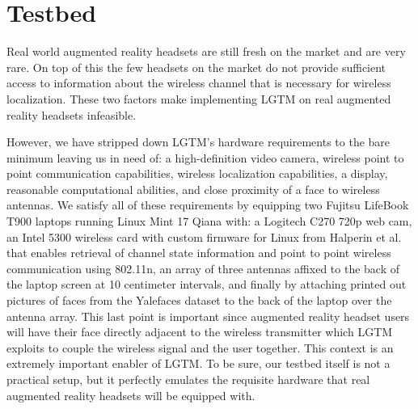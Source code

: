 \documentclass[12pt]{report}
\begin{document}
\section{Testbed}
Real world augmented reality headsets are still fresh on the market and are very rare. On top of this the few headsets on the market do not provide sufficient access to information about the wireless channel that is necessary for wireless localization. These two factors make implementing LGTM on real augmented reality headsets infeasible. \par

However, we have stripped down LGTM's hardware requirements to the bare minimum leaving us in need of: a high-definition video camera, wireless point to point communication capabilities, wireless localization capabilities, a display, reasonable computational abilities, and close proximity of a face to wireless antennas. We satisfy all of these requirements by equipping two Fujitsu LifeBook T900 laptops running Linux Mint 17 Qiana with: a Logitech C270 720p web cam, an Intel 5300 wireless card with custom firmware for Linux from Halperin et al. \cite{ChannelStateInformationToolReleaseHalperin2011} that enables retrieval of channel state information and point to point wireless communication using 802.11n, an array of three antennas affixed to the back of the laptop screen at 10 centimeter intervals, and finally by attaching printed out pictures of faces from the Yalefaces dataset \cite{FisherfacesBelhumeur1997} to the back of the laptop over the antenna array. This last point is important since augmented reality headset users will have their face directly adjacent to the wireless transmitter which LGTM exploits to couple the wireless signal and the user together. This context is an extremely important enabler of LGTM. To be sure, our testbed itself is not a practical setup, but it perfectly emulates the requisite hardware that real augmented reality headsets will be equipped with. \par
\end{document}
